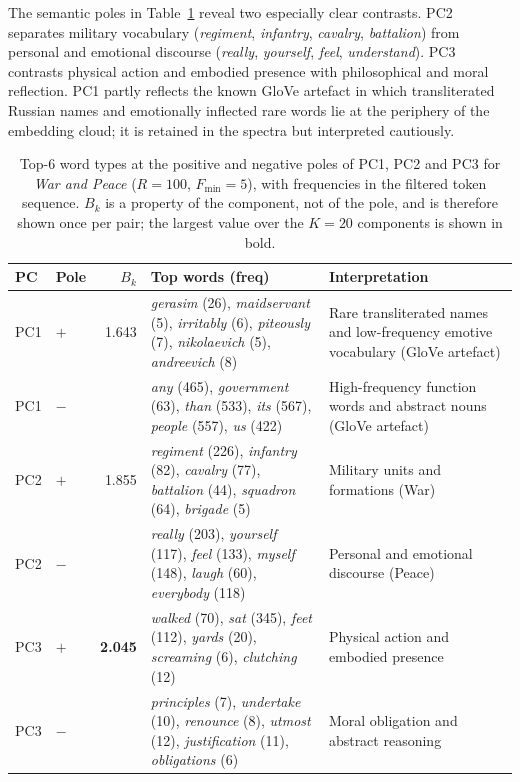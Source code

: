 \documentclass[preprint]{elsarticle}
\begin{document}
The semantic poles in Table~\ref{tab:wrnpc_pc} reveal two especially clear contrasts. PC2
separates military vocabulary (\emph{regiment}, \emph{infantry},
\emph{cavalry}, \emph{battalion}) from personal and emotional discourse
(\emph{really}, \emph{yourself}, \emph{feel}, \emph{understand}). PC3
contrasts physical action and embodied presence with philosophical and
moral reflection. PC1 partly reflects the known GloVe artefact in which
transliterated Russian names and emotionally inflected rare words lie
at the periphery of the embedding cloud; it is retained in the spectra
but interpreted cautiously.

\begin{table}[tbp]
\centering
\caption{Top-6 word types at the positive and negative poles of PC1,
PC2 and PC3 for \emph{War and Peace} ($R=100$, $F_{\min}=5$),
with frequencies in the filtered token sequence.
$B_k$ is a property of the component, not of the pole, and is therefore
shown once per pair; the largest value over the $K=20$ components is
shown in bold.}
\label{tab:wrnpc_pc}
\small
\setlength{\tabcolsep}{4pt}
\begin{tabular}{llr p{5.4cm} p{4.4cm}}
\toprule
PC & Pole & $B_k$ & Top words (freq) & Interpretation \\
\midrule
PC1 & $+$ & 1.643 &
  \emph{gerasim} (26), \emph{maidservant} (5), \emph{irritably} (6),
  \emph{piteously} (7), \emph{nikolaevich} (5), \emph{andreevich} (8)
  & Rare transliterated names and low-frequency emotive vocabulary
    (GloVe artefact) \\
PC1 & $-$ & &
  \emph{any} (465), \emph{government} (63), \emph{than} (533),
  \emph{its} (567), \emph{people} (557), \emph{us} (422)
  & High-frequency function words and abstract nouns (GloVe artefact) \\
\midrule
PC2 & $+$ & 1.855 &
  \emph{regiment} (226), \emph{infantry} (82), \emph{cavalry} (77),
  \emph{battalion} (44), \emph{squadron} (64), \emph{brigade} (5)
  & Military units and formations (War) \\
PC2 & $-$ & &
  \emph{really} (203), \emph{yourself} (117), \emph{feel} (133),
  \emph{myself} (148), \emph{laugh} (60), \emph{everybody} (118)
  & Personal and emotional discourse (Peace) \\
\midrule
PC3 & $+$ & \textbf{2.045} &
  \emph{walked} (70), \emph{sat} (345), \emph{feet} (112),
  \emph{yards} (20), \emph{screaming} (6), \emph{clutching} (12)
  & Physical action and embodied presence \\
PC3 & $-$ & &
  \emph{principles} (7), \emph{undertake} (10), \emph{renounce} (8),
  \emph{utmost} (12), \emph{justification} (11), \emph{obligations} (6)
  & Moral obligation and abstract reasoning \\
\bottomrule
\end{tabular}
\end{table}
\end{document}
